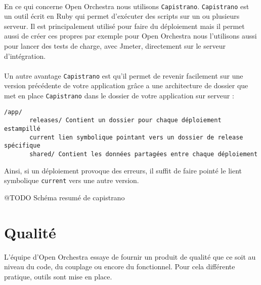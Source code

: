 \paragraph{}
En ce qui concerne Open Orchestra nous utilisons \verb?Capistrano?. \verb?Capistrano? est un outil écrit en Ruby qui permet d'exécuter des scripts sur un ou plusieurs serveur. Il est principalement utilisé pour faire du déploiement mais il permet aussi de créer ces propres par exemple pour Open Orchestra nous l'utilisons aussi pour lancer des tests de charge, avec Jmeter, directement sur le serveur d'intégration.
\paragraph{}
Un autre avantage \verb?Capistrano? est qu'il permet de revenir facilement sur une version précédente de votre application grâce a une architecture de dossier que met en place \verb?Capistrano? dans le dossier de votre application sur serveur : 
\begin{verbatim}
/app/
       releases/ Contient un dossier pour chaque déploiement estampillé
       current lien symbolique pointant vers un dossier de release spécifique
       shared/ Contient les données partagées entre chaque déploiement
\end{verbatim}
Ainsi, si un déploiement provoque des erreurs, il suffit de faire pointé le lient symbolique \verb?current? vers une autre version.

@TODO Schéma resumé de capistrano

\section{Qualité}
L'équipe d'Open Orchestra essaye de fournir un produit de qualité que ce soit au niveau du code, du couplage ou encore du fonctionnel. Pour cela différente pratique, outils sont mise en place.

